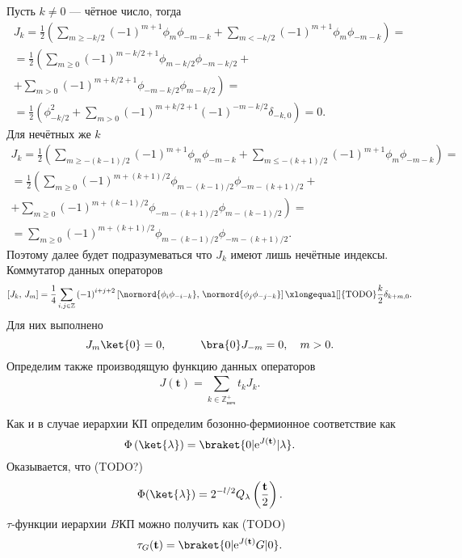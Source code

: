 \documentclass[a5paper,twoside]{article}
\numberwithin{equation}{section}
\begin{document}
Пусть $k\neq 0$ --- чётное число, тогда
\begin{multline}
	J_k=\frac{1}{2} \left(\sum_{m\ge -k /2}^{} (-1)^{m+1}
	\phi_m \phi_{-m-k}+
\sum_{m<-k /2}^{} (-1)^{m+1}\phi_m \phi_{-m-k}\right)=\\=
\frac{1}{2}\left( \sum_{m\ge 0}^{} \left( -1 \right) ^{m-k /2+1}\phi_{m-k /2} \phi_{-m-k/2}\right. + \\ + \left. \sum_{m>0}^{} \left( -1 \right) ^{m+k /2+1}\phi_{-m-k /2}\phi_{m-k /2} \right) =\\=
\frac{1}{2}\left(\phi_{-k /2}^2+ \sum_{m>0}^{}\left( -1 \right) ^{m+k /2+1}\left( -1 \right) ^{-m-k /2}\delta_{-k,0}
\right) =0
.\end{multline} 
Для нечётных же $k$
\begin{multline}
	J_k=\frac{1}{2} \left(\sum_{m\ge -(k-1) /2}^{} (-1)^{m+1}
	\phi_m \phi_{-m-k}+
\sum_{m\le -(k+1) /2}^{} (-1)^{m+1}\phi_m \phi_{-m-k}\right)=\\=
\frac{1}{2}\left( \sum_{m\ge 0}^{} \left( -1 \right) ^{m+(k+1) /2}\phi_{m-(k-1) /2} \phi_{-m-(k+1)/2}\right. + \\ + \left. \sum_{m\ge 0}^{} \left( -1 \right) ^{m+(k-1) /2}\phi_{-m-(k+1) /2}\phi_{m-(k-1) /2} \right) =\\=
 \sum_{m\ge 0}^{}\left( -1 \right) ^{m+(k+1) /2}\phi_{m-(k-1) /2} \phi_{-m-(k+1)/2}
.\end{multline}
Поэтому далее будет подразумеваться что $J_k$ имеют лишь нечётные индексы.
Коммутатор данных операторов
\begin{equation}
\left[ J_k,\,J_m \right] =\frac{1}{4}
\sum_{i,j \in \mathbb{Z}}^{} \left( -1 \right) ^{i+j+2}
\left[\normord{\phi_i \phi_{-i -k}},\,\normord{\phi_j \phi_{-j -k}}\right]\xlongequal[]{\text{TODO}} \frac{k}{2} \delta_{k+m,0}
.\end{equation} 
Для них выполнено
\begin{equation}
J_m  \ket{0}=0,\qquad
\quad \bra{0}J_{-m}=0,\quad m>0
.\end{equation} 
Определим также производящую функцию данных операторов
\begin{equation}
	J(\mathbf{t})= \sum_{k \in \mathbb{Z}_\text{неч}^+}^{} t_k J_k%
.\end{equation} 

Как и в случае иерархии КП определим бозонно-фермионное
соответствие как
\[
	\Phi\left( \ket{\lambda} \right) =\braket{0 | \mathrm{e} ^{J(\mathbf{t})} | \lambda}
.\] 
Оказывается, что (TODO?)
\[
	\Phi(\ket{\lambda})=2^{-l /2} Q_\lambda\left( \frac{\mathbf{t}}{2} \right) 
.\] 
$\tau$-функции иерархии $B$КП можно получить как (TODO)
\begin{equation}
	\tau_G(\mathbf{t})= \braket{0 | \mathrm{e} ^{J(\mathbf{t}) }G | 0}
.\end{equation} 
\end{document}
